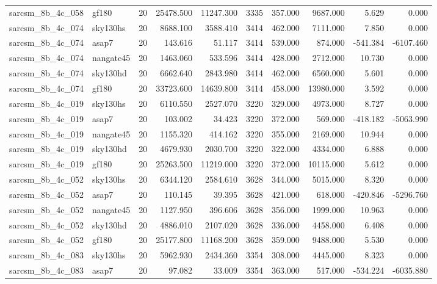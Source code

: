 \documentclass{article}
\begin{document}
\begin{longtable}{llrrrrrrrr}
sarcsm\_8b\_4c\_058 & gf180 & 20 & 25478.500 & 11247.300 & 3335 & 357.000 & 9687.000 & 5.629 & 0.000 \\
sarcsm\_8b\_4c\_074 & sky130hs & 20 & 8688.100 & 3588.410 & 3414 & 462.000 & 7111.000 & 7.850 & 0.000 \\
sarcsm\_8b\_4c\_074 & asap7 & 20 & 143.616 & 51.117 & 3414 & 539.000 & 874.000 & -541.384 & -6107.460 \\
sarcsm\_8b\_4c\_074 & nangate45 & 20 & 1463.060 & 533.596 & 3414 & 428.000 & 2712.000 & 10.730 & 0.000 \\
sarcsm\_8b\_4c\_074 & sky130hd & 20 & 6662.640 & 2843.980 & 3414 & 462.000 & 6560.000 & 5.601 & 0.000 \\
sarcsm\_8b\_4c\_074 & gf180 & 20 & 33723.600 & 14639.800 & 3414 & 458.000 & 13980.000 & 3.592 & 0.000 \\
sarcsm\_8b\_4c\_019 & sky130hs & 20 & 6110.550 & 2527.070 & 3220 & 329.000 & 4973.000 & 8.727 & 0.000 \\
sarcsm\_8b\_4c\_019 & asap7 & 20 & 103.002 & 34.423 & 3220 & 372.000 & 569.000 & -418.182 & -5063.990 \\
sarcsm\_8b\_4c\_019 & nangate45 & 20 & 1155.320 & 414.162 & 3220 & 355.000 & 2169.000 & 10.944 & 0.000 \\
sarcsm\_8b\_4c\_019 & sky130hd & 20 & 4679.930 & 2030.700 & 3220 & 322.000 & 4334.000 & 6.888 & 0.000 \\
sarcsm\_8b\_4c\_019 & gf180 & 20 & 25263.500 & 11219.000 & 3220 & 372.000 & 10115.000 & 5.612 & 0.000 \\
sarcsm\_8b\_4c\_052 & sky130hs & 20 & 6344.120 & 2584.610 & 3628 & 344.000 & 5015.000 & 8.320 & 0.000 \\
sarcsm\_8b\_4c\_052 & asap7 & 20 & 110.145 & 39.395 & 3628 & 421.000 & 618.000 & -420.846 & -5296.760 \\
sarcsm\_8b\_4c\_052 & nangate45 & 20 & 1127.950 & 396.606 & 3628 & 356.000 & 1999.000 & 10.963 & 0.000 \\
sarcsm\_8b\_4c\_052 & sky130hd & 20 & 4886.010 & 2107.020 & 3628 & 336.000 & 4458.000 & 6.408 & 0.000 \\
sarcsm\_8b\_4c\_052 & gf180 & 20 & 25177.800 & 11168.200 & 3628 & 359.000 & 9488.000 & 5.530 & 0.000 \\
sarcsm\_8b\_4c\_083 & sky130hs & 20 & 5962.930 & 2434.360 & 3354 & 308.000 & 4445.000 & 8.323 & 0.000 \\
sarcsm\_8b\_4c\_083 & asap7 & 20 & 97.082 & 33.009 & 3354 & 363.000 & 517.000 & -534.224 & -6035.880 \\

\end{longtable}
\end{document}
